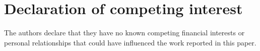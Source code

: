 \section*{Declaration of competing interest}
The authors declare that they have no known competing financial interests or personal relationships that could have influenced the work reported in this paper.
